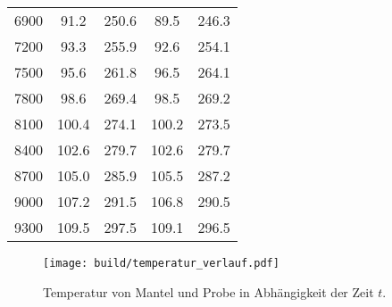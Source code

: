 \begin{table}
\begin{tabular}{c c c c c}
  6900	&	91.2	&	250.6	&	89.5	&	246.3   \\
  7200	&	93.3	&	255.9	&	92.6	&	254.1   \\
  7500	&	95.6	&	261.8	&	96.5	&	264.1   \\
  7800	&	98.6	&	269.4	&	98.5	&	269.2   \\
  8100	&	100.4	&	274.1	&	100.2	&	273.5   \\
  8400	&	102.6	&	279.7	&	102.6	&	279.7   \\
  8700	&	105.0	&	285.9	&	105.5	&	287.2   \\
  9000	&	107.2	&	291.5	&	106.8	&	290.5   \\
  9300	&	109.5	&	297.5	&	109.1	&	296.5   \\
\end{tabular}
\end{table}

\begin{figure}
  \centering
  \texttt{[image: build/temperatur\_verlauf.pdf]}
  \caption{Temperatur von Mantel und Probe in Abhängigkeit der Zeit $t$.}
  \label{fig:T_mess}
\end{figure}



